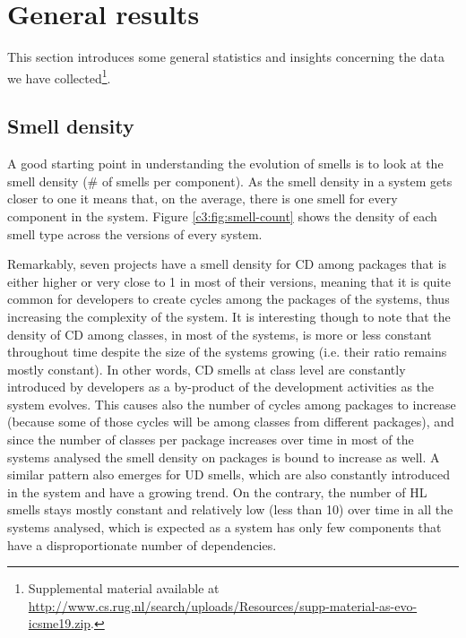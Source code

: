 \section{General results}\label{c3:sec:general-results}
This section introduces some general statistics and insights concerning the data we have collected\footnote{\label{fn:supp-mat}Supplemental material available at \url{http://www.cs.rug.nl/search/uploads/Resources/supp-material-as-evo-icsme19.zip}.}.

\subsection{Smell density}
A good starting point in understanding the evolution of smells is to look at the smell density (\# of smells per component).
As the smell density in a system gets closer to one it means that, on the average,  there is one smell for every component in the system.
Figure \ref{c3:fig:smell-count} shows the density of each smell type across the versions of every system. 

Remarkably, seven projects have a smell density for CD among packages that is either higher or very close to 1 in most of their versions, meaning that it is quite common for developers to create cycles among the packages of the systems, thus increasing the complexity of the system.
It is interesting though to note that the density of CD among classes, in most of the systems, is more or less constant throughout time despite the size of the systems growing (i.e. their ratio remains mostly constant).
In other words, CD smells at class level are constantly introduced by developers as a by-product of the development activities as the system evolves.
This causes also the number of cycles among packages to increase (because some of those cycles will be among classes from different packages), and since the number of classes per package increases over time in most of the systems analysed the smell density on packages is bound to increase as well.
A similar pattern also emerges for UD smells, which are also constantly introduced in the system and have a growing trend.
On the contrary, the number of HL smells stays mostly constant and relatively low (less than 10) over time in all the systems analysed, which is expected as a system has only few components that have a disproportionate number of dependencies.

\vspace{1mm}

